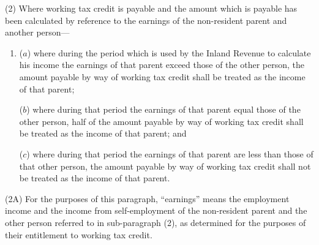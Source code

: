 \documentclass[12pt,a4paper]{article}
\begin{document}
(2) Where 
working tax credit  %
is payable and the amount which is payable has been calculated by reference to 
the earnings  %
of the non-resident parent and another person—
\begin{enumerate}\item[]
($a$) where during the period which is used by the Inland Revenue to calculate his income 
the earnings  %
of that parent exceed those of the other person, the amount payable by way of 
working tax credit  %
shall be treated as the income of that parent;

($b$) where during that period 
the earnings  %
of that parent equal those of the other person, half of the amount payable by way of 
working tax credit  %
shall be treated as the income of that parent; and

($c$) where during that period 
the earnings  %
of that parent are less than those of that other person, the amount payable by way of 
working tax credit  %
shall not be treated as the income of that parent.
\end{enumerate}

(2A) For the purposes of this paragraph, “earnings” means the employment income and the income from self-employment of the non-resident parent and the other person referred to in sub-paragraph (2), as determined for the purposes of their entitlement to working tax credit.
\end{document}
